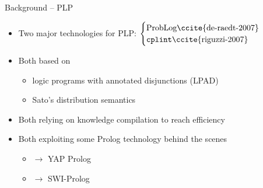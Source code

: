 \documentclass[presentation]{beamer}\mode<presentation>{\usetheme{AMSBolognaFC}}
\begin{document}
\begin{frame}[c]{Background -- PLP}

    \begin{itemize}
        \item Two major technologies for PLP: $\begin{cases}
            \text{\problog\ccite{de-raedt-2007}}
            \\
            \text{\cplint\ccite{riguzzi-2007}}
        \end{cases}$

        \bigskip

        \item Both based on
        \begin{itemize}
            \item logic programs with annotated disjunctions (\alert{LPAD})

            \item Sato's \alert{distribution semantics}
        \end{itemize}

        \bigskip

        \item Both relying on \alert{knowledge compilation} to reach efficiency

        \bigskip

        \item Both exploiting some \alert{Prolog technology} behind the scenes
        \begin{itemize}
            \item \problog{} $\longrightarrow$ YAP Prolog
            \item \cplint{} $\longrightarrow$ SWI-Prolog
        \end{itemize}

    \end{itemize}

\end{frame}


\section*{}

\frame{\titlepage}
\end{document}
